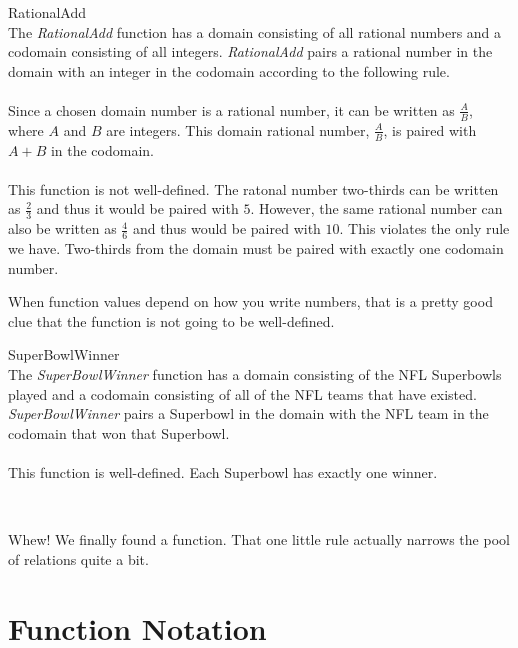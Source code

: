 \documentclass{ximera}
\begin{document}
\begin{example} RationalAdd \\
The \textit{RationalAdd} function has a domain consisting of all rational numbers and a codomain consisting of all integers.  \textit{RationalAdd} pairs a rational number in the domain with an integer in the codomain according to the following rule.
\\ \\ 
Since a chosen domain number is a rational number, it can be written as $\tfrac{A}{B}$, where $A$ and $B$ are integers. This domain rational number, $\tfrac{A}{B}$, is paired with $A+B$ in the codomain.
\\ \\ 
This function is not well-defined.  The ratonal number two-thirds can be written as $\tfrac{2}{3}$ and thus it would be paired with $5$.  However, the same rational number can also be written as $\tfrac{4}{6}$ and thus would be paired with $10$.  This violates the only rule we have.  Two-thirds from the domain must be paired with exactly one codomain number.

\begin{warning}
When function values depend on how you write numbers, that is a pretty good clue that the function is not going to be well-defined.
\end{warning}
\end{example}



\begin{example} SuperBowlWinner  \\
The \textit{SuperBowlWinner} function has a domain consisting of the NFL Superbowls played and a codomain consisting of all of the NFL teams that have existed.  \textit{SuperBowlWinner} pairs a Superbowl in the domain with the NFL team in the codomain that won that Superbowl.  \\ 
\\
This function is well-defined. Each Superbowl has exactly one winner.
\end{example}

\, 

Whew!  We finally found a function. That one little rule actually narrows the pool of relations quite a bit.



\section{Function Notation}
\end{document}

